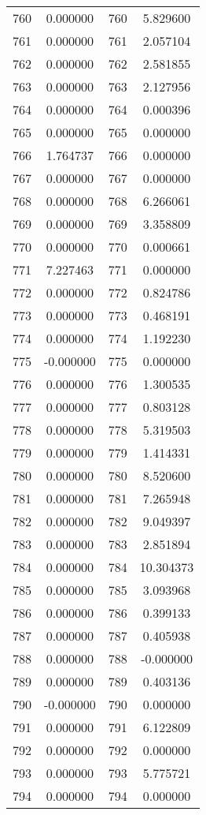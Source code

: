\documentclass[12pt]{article}
\begin{document}
\begin{longtable}{@{}cccc@{}}
760 & 0.000000 & 760 & 5.829600 \\
761 & 0.000000 & 761 & 2.057104 \\
762 & 0.000000 & 762 & 2.581855 \\
763 & 0.000000 & 763 & 2.127956 \\
764 & 0.000000 & 764 & 0.000396 \\
765 & 0.000000 & 765 & 0.000000 \\
766 & 1.764737 & 766 & 0.000000 \\
767 & 0.000000 & 767 & 0.000000 \\
768 & 0.000000 & 768 & 6.266061 \\
769 & 0.000000 & 769 & 3.358809 \\
770 & 0.000000 & 770 & 0.000661 \\
771 & 7.227463 & 771 & 0.000000 \\
772 & 0.000000 & 772 & 0.824786 \\
773 & 0.000000 & 773 & 0.468191 \\
774 & 0.000000 & 774 & 1.192230 \\
775 & -0.000000 & 775 & 0.000000 \\
776 & 0.000000 & 776 & 1.300535 \\
777 & 0.000000 & 777 & 0.803128 \\
778 & 0.000000 & 778 & 5.319503 \\
779 & 0.000000 & 779 & 1.414331 \\
780 & 0.000000 & 780 & 8.520600 \\
781 & 0.000000 & 781 & 7.265948 \\
782 & 0.000000 & 782 & 9.049397 \\
783 & 0.000000 & 783 & 2.851894 \\
784 & 0.000000 & 784 & 10.304373 \\
785 & 0.000000 & 785 & 3.093968 \\
786 & 0.000000 & 786 & 0.399133 \\
787 & 0.000000 & 787 & 0.405938 \\
788 & 0.000000 & 788 & -0.000000 \\
789 & 0.000000 & 789 & 0.403136 \\
790 & -0.000000 & 790 & 0.000000 \\
791 & 0.000000 & 791 & 6.122809 \\
792 & 0.000000 & 792 & 0.000000 \\
793 & 0.000000 & 793 & 5.775721 \\
794 & 0.000000 & 794 & 0.000000 \\

\end{longtable}
\end{document}
